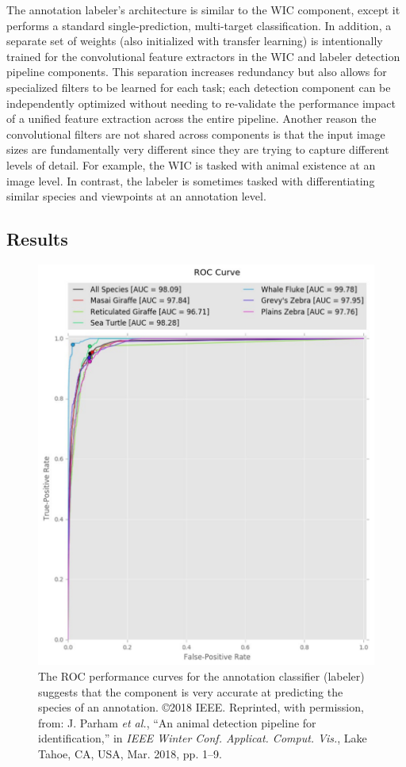 The annotation labeler's architecture is similar to the WIC component, except it performs a standard single-prediction, multi-target classification. In addition, a separate set of weights (also initialized with transfer learning) is intentionally trained for the convolutional feature extractors in the WIC and labeler detection pipeline components.  This separation increases redundancy but also allows for specialized filters to be learned for each task; each detection component can be independently optimized without needing to re-validate the performance impact of a unified feature extraction across the entire pipeline.  Another reason the convolutional filters are not shared across components is that the input image sizes are fundamentally very different since they are trying to capture different levels of detail.  For example, the WIC is tasked with animal existence at an image level. In contrast, the labeler is sometimes tasked with differentiating similar species and viewpoints at an annotation level.

\subsection{Results}

\begin{figure}[!t]
    \begin{center}
        \includegraphics[width=0.93\linewidth]{resources/labeler-roc.pdf}
    \end{center}
    \caption{The ROC performance curves for the annotation classifier (labeler) suggests that the component is very accurate at predicting the species of an annotation.  \copyright 2018 IEEE. Reprinted, with permission, from: J. Parham \textit{et al.}, ``An animal detection pipeline for identification,'' in \textit{IEEE Winter Conf. Applicat. Comput. Vis.}, Lake Tahoe, CA, USA, Mar. 2018, pp. 1–9.}
    \label{fig:labeler-roc}
\end{figure}

